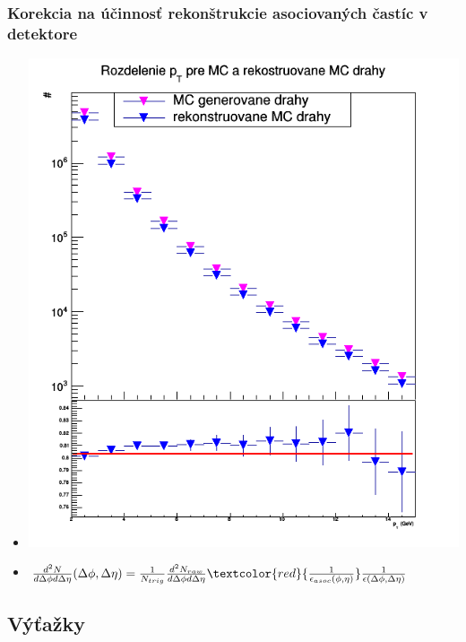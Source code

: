 \documentclass{beamer}
\begin{document}
	\begin{frame}
		\frametitle{Korekcia na účinnosť rekonštrukcie asociovaných častíc v detektore}
		\begin{center}
			\begin{itemize}
				\item[] \centering \includegraphics[scale=0.25]{../Obrazky_praca/MC_closure.png}
				\item[] $\frac{d^2N}{d\Delta\phi d\Delta\eta}(\Delta\phi,\Delta \eta) = \frac{1}{N_{trig}} \frac{d^2N_{raw}}{d\Delta\phi d\Delta\eta} \textcolor{red}{\frac{1}{\epsilon_{asoc}(\phi,\eta)}}\frac{1}{\epsilon(\Delta\phi,\Delta\eta)}$
			\end{itemize}
		\end{center}
	
			
		
	\end{frame}

\subsection{Výťažky}
\end{document}
